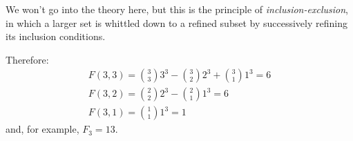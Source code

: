 \documentclass[11pt, oneside]{article} 	%
\begin{document}
We won't go into the theory here, but this is the principle of \textit{inclusion-exclusion}, in which a larger set is whittled down to a refined subset by successively refining its inclusion conditions.

Therefore:
\begin{align}
F(3,3) = \binom{3}{3}3^3 - \binom{3}{2}2^3 + \binom{3}{1}1^3 = 6 \\
F(3,2) = \binom{2}{2}2^3-\binom{2}{1}{1^3} = 6 \\ 
F(3,1) = \binom{1}{1}1^3 = 1 
\end{align}
and, for example, $F_3 = 13$.
\end{document}
